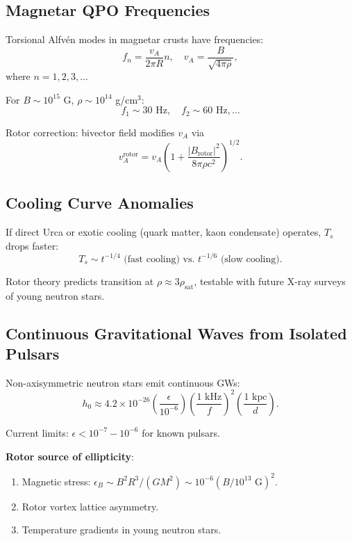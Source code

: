 \documentclass[12pt,a4paper]{article}
\theoremstyle{definition}
\theoremstyle{remark}
\begin{document}
\subsection{Magnetar QPO Frequencies}

Torsional Alfvén modes in magnetar crusts have frequencies:
\begin{equation}
f_n = \frac{v_A}{2\pi R} n, \quad v_A = \frac{B}{\sqrt{4\pi \rho}},
\end{equation}
where $n = 1, 2, 3, \ldots$

For $B \sim 10^{15}$ G, $\rho \sim 10^{14}$ g/cm$^3$:
\begin{equation}
f_1 \sim 30 \text{ Hz}, \quad f_2 \sim 60 \text{ Hz}, \ldots
\end{equation}

Rotor correction: bivector field modifies $v_A$ via
\begin{equation}
v_A^{\text{rotor}} = v_A \left(1 + \frac{|B_{\text{rotor}}|^2}{8\pi \rho c^2}\right)^{1/2}.
\end{equation}

\subsection{Cooling Curve Anomalies}

If direct Urca or exotic cooling (quark matter, kaon condensate) operates, $T_s$ drops faster:
\begin{equation}
T_s \sim t^{-1/4} \text{ (fast cooling) vs. } t^{-1/6} \text{ (slow cooling)}.
\end{equation}

Rotor theory predicts transition at $\rho \approx 3 \rho_{\text{sat}}$, testable with future X-ray surveys of young neutron stars.

\subsection{Continuous Gravitational Waves from Isolated Pulsars}

Non-axisymmetric neutron stars emit continuous GWs:
\begin{equation}
h_0 \approx 4.2 \times 10^{-26} \left(\frac{\epsilon}{10^{-6}}\right) \left(\frac{1 \text{ kHz}}{f}\right)^2 \left(\frac{1 \text{ kpc}}{d}\right).
\end{equation}

Current limits: $\epsilon < 10^{-7}-10^{-6}$ for known pulsars.

\textbf{Rotor source of ellipticity}:
\begin{enumerate}
\item Magnetic stress: $\epsilon_B \sim B^2 R^3 / (GM^2) \sim 10^{-6} (B/10^{13} \text{ G})^2$.
\item Rotor vortex lattice asymmetry.
\item Temperature gradients in young neutron stars.
\end{enumerate}
\end{document}
